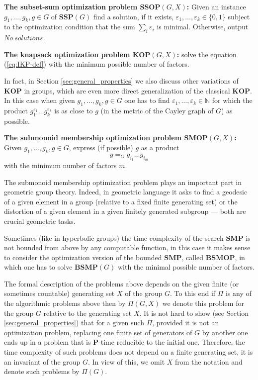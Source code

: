 \documentclass[11pt]{amsart}
\theoremstyle{definition}
\def\P{{\mathbf{P}}}
\def\SSP{{\mathbf{SSP}}}
\def\SMP{{\mathbf{SMP}}}
\def\BSMP{{\mathbf{BSMP}}}
\def\KOP{{\mathbf{KOP}}}
\def\SSOP{{\mathbf{SSOP}}}
\def\SMOP{{\mathbf{SMOP}}}
\def\BSMOP{{\mathbf{BSMOP}}}
\begin{document}
\medskip
\noindent
{\bf The subset-sum optimization problem $\SSOP(G,X)$\index{$\SSOP(G,X)$}:}  Given an instance $g_1,\ldots,g_k,g\in G$ of  $\SSP(G)$ find a solution, if it exists,
$\varepsilon_1,\ldots,\varepsilon_k \in \{0,1\}$  subject to the optimization  condition that
the sum $\sum_i \varepsilon_i$ is minimal. Otherwise, output $No \ solutions$.

\medskip
\noindent
{\bf The knapsack optimization problem  $\KOP(G,X)$\index{$\KOP(G,X)$}:} solve the equation (\ref{eq:IKP-def}) 
with the minimum possible number of factors.

\medskip
In fact, in Section \ref{sec:general_properties} we also discuss other variations of $\KOP$ in groups,  which are even more direct generalization of the classical $\KOP$. In this case  when given $g_1,\ldots,g_k,g\in G$ one has to find $\varepsilon_1,\ldots,\varepsilon_k \in \mathbb{N}$ for which  the product $g_1^{\varepsilon_1}\ldots g_k^{\varepsilon_k}$ is as close to $g$ (in the metric of the Cayley graph of $G$) as possible.


\medskip
\noindent
{\bf The submonoid membership optimization problem $\SMOP(G,X)$\index{$\SMOP(G,X)$}:} %
Given $g_1,\ldots,g_k,g\in G$, %
express (if possible) $g$ as a product
\begin{equation}\label{eq:MSP_G}
g =_G g_{i_1} \ldots g_{i_m}
\end{equation}
with the  minimum number of factors $m$.

\medskip
The submonoid membership optimization problem plays an important part in geometric group theory.  Indeed, in geometric language it asks to find a geodesic of a given element in a group (relative to a fixed finite generating set) or the distortion of a given element in a given finitely generated subgroup --- both are crucial geometric tasks.

Sometimes (like in hyperbolic groups) the time complexity of the search $\SMP$ is not bounded from above by any computable function, in this case it makes sense to consider the optimization  version of the bounded $\SMP$, called $\BSMOP$, in which one has to solve $\BSMP(G)$ with the minimal possible number of factors.

The formal description  of the problems above depends on the given finite (or sometimes countable) generating set $X$ of the group $G$.
To this end if $\Pi$ is any of the algorithmic problems above then by $\Pi(G,X)$ we denote this problem for the group $G$ relative to the generating set $X$.  It
is not hard to show (see Section \ref{sec:general_properties}) that for a given such $\Pi$, provided it is not an optimization problem, replacing one  finite
set of generators of $G$ by another  one ends up in a problem that is $\P$-time reducible
to the initial one.
Therefore, the time complexity of such  problems does not depend on a finite generating set,
it is an invariant of the group $G$.
In view of this, we omit $X$ from the notation   and denote such problems  by $\Pi(G)$.
\end{document}
